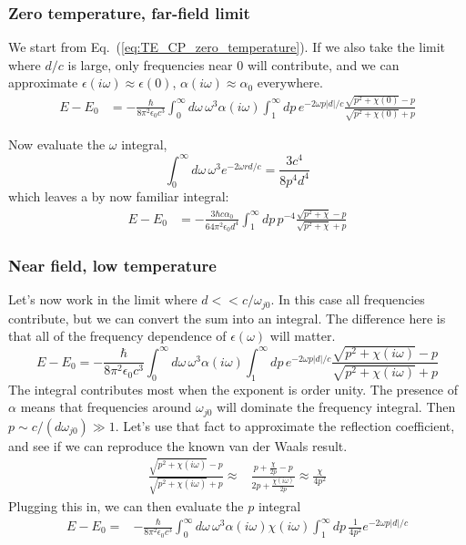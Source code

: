 \subsubsection{Zero temperature, far-field limit}

We start from Eq.~(\ref{eq:TE_CP_zero_temperature}).
  If we also take the limit where $d/c$ is large, only frequencies near $0$ will contribute,
 and we can approximate $\epsilon(i\omega) \approx \epsilon(0)$, $\alpha(i\omega)\approx\alpha_0$ everywhere.  
\begin{align}
E-E_0&=-\frac{\hbar}{8\pi^2\epsilon_0c^3}\int_0^\infty d\omega\,\omega^3\alpha(i\omega)
\int_1^\infty dp\,e^{-2\omega p|d|/c}\frac{\sqrt{p^2+\chi(0)}-p}{\sqrt{p^2+\chi(0)}+p}
\end{align}

 Now evaluate the $\omega$ integral, 
\begin{equation}
\int_{0}^\infty d\omega\,\omega^3e^{-2\omega r d/c} = \frac{3 c^4}{8 p^4 d^4}
\end{equation}
which leaves a by now familiar integral:
\begin{align}
E-E_0&= -\frac{3\hbar c\alpha_0}{64\pi^2 \epsilon_0 d^4}\int_1^\infty dp\,p^{-4}\frac{\sqrt{p^2+\chi}-p}{\sqrt{p^2+\chi}+p}
\end{align}

\subsubsection{Near field, low temperature}
Let's now work in the limit where $d<<c/\omega_{j0}$.
  In this case all frequencies contribute, but we can convert the sum into an integral.
  The difference here is that all of the frequency dependence of $\epsilon(\omega)$  will matter.  
\begin{equation}
E-E_0=-\frac{\hbar}{8\pi^2\epsilon_0c^3}\int_0^\infty d\omega\,\omega^3\alpha(i\omega)
\int_1^\infty dp\,e^{-2\omega p|d|/c}\frac{\sqrt{p^2+\chi(i\omega)}-p}{\sqrt{p^2+\chi(i\omega)}+p}
\end{equation}
The integral contributes most when the exponent is order unity.
  The presence of $\alpha$ means that frequencies around $\omega_{j0}$ will dominate the frequency integral.
  Then $p \sim  c/(d\omega_{j0})\gg 1$.
  Let's use that fact to approximate the reflection coefficient, 
and see if we can reproduce the known van der Waals result.  
\begin{align}
  \frac{\sqrt{p^2+\chi(i\omega)}-p}{\sqrt{p^2+\chi(i\omega)}+p}\approx 
& \frac{ p + \frac{\chi}{2p}-p}{2p+\frac{\chi(i\omega)}{2p}} \approx \frac{\chi}{4p^2} 
\end{align}
Plugging this in, we can then evaluate the $p$ integral
\begin{align}
E-E_0=&-\frac{\hbar}{8\pi^2\epsilon_0c^3}\int_0^\infty d\omega\,\omega^3\alpha(i\omega)\chi(i\omega)
\int_1^\infty dp\,\frac{1}{4p^2}e^{-2\omega p|d|/c}
\end{align}

